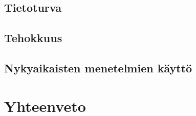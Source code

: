 \documentclass[finnish]{tktltiki2}
\theoremstyle{definition}
\theoremstyle{remark}
\begin{document}
\subsection{Tietoturva}
\subsection{Tehokkuus}
\subsection{Nykyaikaisten menetelmien käyttö}

\section{Yhteenveto}  



%
%
%

\newpage






 
\end{document}
